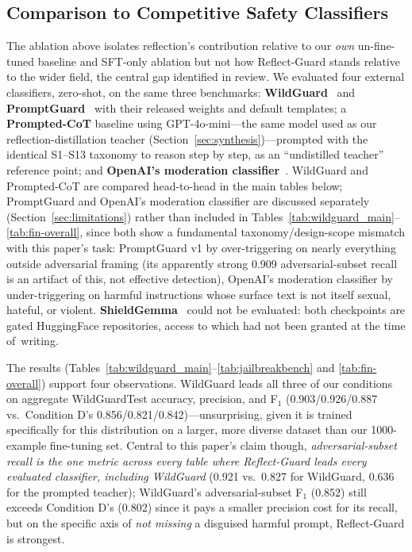 \documentclass[superintelligence,article,accept,moreauthors]{Definitions/mdpi}
\begin{document}
\subsection{Comparison to Competitive Safety Classifiers}
\label{sec:competitive}

The ablation above isolates reflection's contribution relative to our \emph{own} un-fine-tuned baseline and SFT-only ablation but not how Reflect-Guard stands relative to the wider field, the central gap identified in review. We evaluated four external classifiers, zero-shot, on the same three benchmarks: \textbf{WildGuard}~\citep{han2024wildguard} and \textbf{PromptGuard}~\citep{meta2024promptguard} with their released weights and default templates; a \textbf{Prompted-CoT} baseline using GPT-4o-mini---the same model used as our reflection-distillation teacher (Section~\ref{sec:synthesis})---prompted with the identical S1--S13 taxonomy to reason step by step, as an ``undistilled teacher'' reference point; and \textbf{OpenAI's moderation classifier}~\citep{markov2023holistic}. WildGuard and Prompted-CoT are compared head-to-head in the main tables below; PromptGuard and OpenAI's moderation classifier are discussed separately (Section~\ref{sec:limitations}) rather than included in Tables~\ref{tab:wildguard_main}--\ref{tab:fin-overall}, since both show a fundamental taxonomy/design-scope mismatch with this paper's task: PromptGuard v1 by over-triggering on nearly everything outside adversarial framing (its apparently strong 0.909 adversarial-subset recall is an artifact of this, not effective detection), OpenAI's moderation classifier by under-triggering on harmful instructions whose surface text is not itself sexual, hateful, or violent. \textbf{ShieldGemma}~\citep{zeng2024shieldgemma} could not be evaluated: both checkpoints are gated HuggingFace repositories, access to which had not been granted at the time \mbox{of writing.}

The results (Tables~\ref{tab:wildguard_main}--\ref{tab:jailbreakbench} and \ref{tab:fin-overall}) support four observations. WildGuard leads all three of our conditions on aggregate WildGuardTest accuracy, precision, and F$_1$ (0.903/0.926/0.887 vs.\ Condition D's 0.856/0.821/0.842)---unsurprising, given it is trained specifically for this distribution on a larger, more diverse dataset than our 1000-example fine-tuning set. Central to this paper's claim though, \emph{adversarial-subset recall is the one metric across every table where Reflect-Guard leads every evaluated classifier, including WildGuard} (0.921 vs.\ 0.827 for WildGuard, 0.636 for the prompted teacher); WildGuard's adversarial-subset F$_1$ (0.852) still exceeds Condition D's (0.802) since it pays a smaller precision cost for its recall, but on the specific axis of \emph{not missing} a disguised harmful prompt, Reflect-Guard is strongest.
\end{document}
